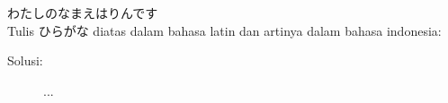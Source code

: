\item
{\japantwo わたしのなまえはりんです} \\
Tulis {\japan ひらがな} diatas dalam bahasa latin dan artinya dalam bahasa indonesia:
\\
\begin{description}
\item[Solusi:]
    ...
\end{description}
